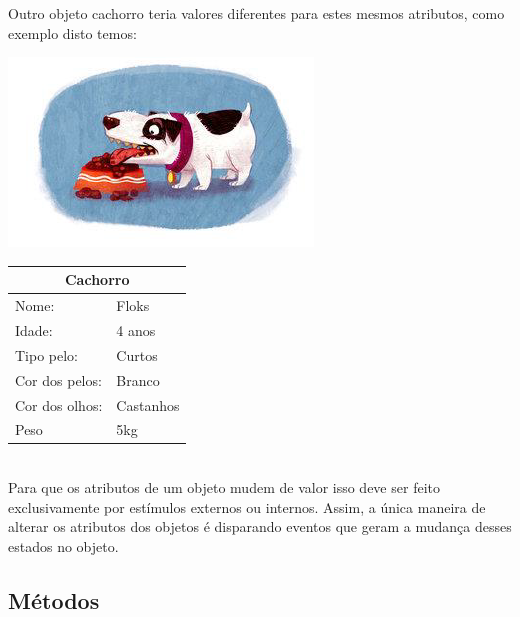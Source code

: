   Outro objeto cachorro teria valores diferentes para estes mesmos atributos, como exemplo disto temos:

  \begin{minipage}{\textwidth}
    \begin{minipage}[b]{0.49\textwidth}
      \centering
      \includegraphics[scale=0.6]{imagens/cachorro-objeto-2.png}
      \label{fig:cachorro-objeto-2}
    \end{minipage}
    \hfill
    \begin{minipage}[b]{0.49\textwidth}
      \centering
      \begin{tabular}{|l|l|}
        \hline
        \multicolumn{2}{|c|}{Cachorro}      \\ \hline
          Nome:                 & Floks     \\ \hline
          Idade:                & 4 anos    \\ \hline
          Tipo pelo:            & Curtos    \\ \hline
          Cor dos pelos:        & Branco    \\ \hline
          Cor dos olhos:        & Castanhos \\ \hline
          Peso                  & 5kg       \\ \hline
        \end{tabular}
      \end{minipage}
    \end{minipage} \\ 

Para que os atributos de um objeto mudem de valor isso deve ser feito  exclusivamente por estímulos externos ou internos. Assim, a única maneira  de alterar os atributos dos objetos é disparando eventos que geram a mudança desses estados no objeto.

\subsection{Métodos}

